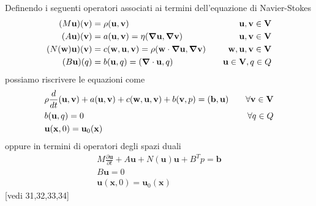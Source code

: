 Definendo i seguenti operatori associati ai termini dell'equazione di Navier-Stokes
\begin{equation}
\begin{aligned}
(M\mathbf{u})(\mathbf{v})&=\rho\ps{\mathbf{u}}{\mathbf{v}} \quad &\mathbf{u},\mathbf{v}\in \mathbf{V}\\
(A\mathbf{u})(\mathbf{v})&=a(\mathbf{u},\mathbf{v})=\eta\ps{\Nabla\mathbf{u}}{\Nabla\mathbf{v}} \quad &\mathbf{u},\mathbf{v}\in \mathbf{V}\\
(N(\mathbf{w})\mathbf{u})(\mathbf{v})&=c(\mathbf{w},\mathbf{u},\mathbf{v})=\rho\ps{\mathbf{w}\cdot\Nabla\mathbf{u}}{\Nabla\mathbf{v}} \quad &\mathbf{w},\mathbf{u},\mathbf{v}\in \mathbf{V}\\
(B\mathbf{u})(q)&=b(\mathbf{u},q)=\ps{\Nabla\cdot\mathbf{u}}{q} \quad &\mathbf{u}\in \mathbf{V},q\in Q
\end{aligned}
\end{equation}
possiamo riscrivere le equazioni come
\begin{equation}
\begin{aligned}
&\rho\frac{d}{dt}\ps{\mathbf{u}}{\mathbf{v}}+a(\mathbf{u},\mathbf{v})+c(\mathbf{w},\mathbf{u},\mathbf{v})+b(\mathbf{v},p)=\ps{\mathbf{b}}{\mathbf{u}} \quad &\forall\mathbf{v}\in\mathbf{V}\\
&b(\mathbf{u},q)=0 \quad &\forall q\in Q\\
&\mathbf{u}(\mathbf{x},0)=\mathbf{u}_0(\mathbf{x})&
\end{aligned}
\end{equation}
oppure in termini di operatori degli spazi duali
\begin{equation}
\begin{aligned}
&M\frac{\partial\mathbf{u}}{\partial t}+A\mathbf{u}+N(\mathbf{u})\mathbf{u}+B^{T}p=\mathbf{b}\\
&B\mathbf{u}=0\\
&\mathbf{u}(\mathbf{x},0)=\mathbf{u}_0(\mathbf{x})&
\end{aligned}
\end{equation}
[vedi 31,32,33,34]

